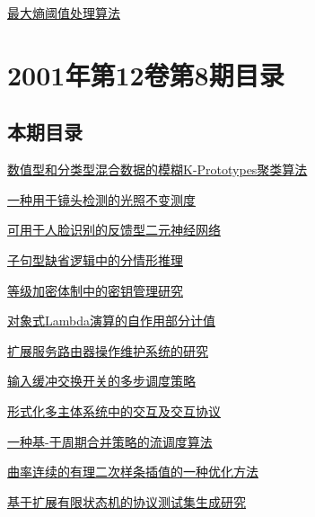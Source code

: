 \documentclass[a4paper]{article}
\begin{document}
\href{http://www.jos.org.cn/ch/reader/download_pdf.aspx?file_no=20010922&year_id=2001&quarter_id=9&falg=1}{最大熵阈值处理算法}


\section{\textbf{2001年第12卷第8期目录}}
\subsection{本期目录}
\href{http://www.jos.org.cn/ch/reader/download_pdf.aspx?file_no=20010801&year_id=2001&quarter_id=8&falg=1}{数值型和分类型混合数据的模糊K-Prototypes聚类算法}

\href{http://www.jos.org.cn/ch/reader/download_pdf.aspx?file_no=20010802&year_id=2001&quarter_id=8&falg=1}{一种用于镜头检测的光照不变测度}

\href{http://www.jos.org.cn/ch/reader/download_pdf.aspx?file_no=20010803&year_id=2001&quarter_id=8&falg=1}{可用于人脸识别的反馈型二元神经网络}

\href{http://www.jos.org.cn/ch/reader/download_pdf.aspx?file_no=20010804&year_id=2001&quarter_id=8&falg=1}{子句型缺省逻辑中的分情形推理}

\href{http://www.jos.org.cn/ch/reader/download_pdf.aspx?file_no=20010805&year_id=2001&quarter_id=8&falg=1}{等级加密体制中的密钥管理研究}

\href{http://www.jos.org.cn/ch/reader/download_pdf.aspx?file_no=20010806&year_id=2001&quarter_id=8&falg=1}{对象式Lambda演算的自作用部分计值}

\href{http://www.jos.org.cn/ch/reader/download_pdf.aspx?file_no=20010807&year_id=2001&quarter_id=8&falg=1}{扩展服务路由器操作维护系统的研究}

\href{http://www.jos.org.cn/ch/reader/download_pdf.aspx?file_no=20010808&year_id=2001&quarter_id=8&falg=1}{输入缓冲交换开关的多步调度策略}

\href{http://www.jos.org.cn/ch/reader/download_pdf.aspx?file_no=20010809&year_id=2001&quarter_id=8&falg=1}{形式化多主体系统中的交互及交互协议}

\href{http://www.jos.org.cn/ch/reader/download_pdf.aspx?file_no=20010810&year_id=2001&quarter_id=8&falg=1}{一种基-于周期合并策略的流调度算法}

\href{http://www.jos.org.cn/ch/reader/download_pdf.aspx?file_no=20010811&year_id=2001&quarter_id=8&falg=1}{曲率连续的有理二次样条插值的一种优化方法}

\href{http://www.jos.org.cn/ch/reader/download_pdf.aspx?file_no=20010812&year_id=2001&quarter_id=8&falg=1}{基于扩展有限状态机的协议测试集生成研究}
\end{document}
